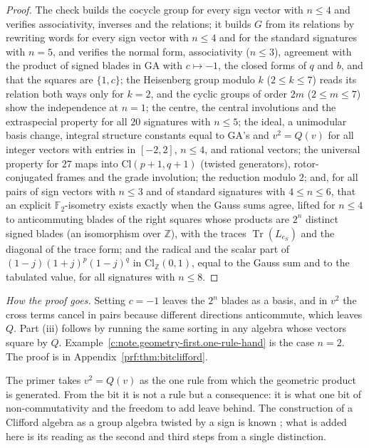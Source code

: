 \documentclass[11pt]{article}
\theoremstyle{definition}
\theoremstyle{plain}
\providecommand{\Cl}{}\renewcommand{\Cl}{\mathrm{Cl}}
\providecommand{\Tr}{}\renewcommand{\Tr}{\operatorname{Tr}}
\providecommand{\Z}{}\renewcommand{\Z}{\mathbb{Z}}
\begin{document}
\begin{proof}
The check builds the cocycle group for every sign vector with $n \le 4$ and verifies associativity, inverses and the relations; it builds $G$ from its relations by rewriting words for every sign vector with $n \le 4$ and for the standard signatures with $n = 5$, and verifies the normal form, associativity ($n \le 3$), agreement with the product of signed blades in GA with $c \mapsto -1$, the closed forms of $q$ and $b$, and that the squares are $\{1, c\}$; the Heisenberg group modulo $k$ ($2 \le k \le 7$) reads its relation both ways only for $k = 2$, and the cyclic groups of order $2m$ ($2 \le m \le 7$) show the independence at $n = 1$; the centre, the central involutions and the extraspecial property for all $20$ signatures with $n \le 5$; the ideal, a unimodular basis change, integral structure constants equal to GA's and $v^{2} = Q(v)$ for all integer vectors with entries in $[-2, 2]$, $n \le 4$, and rational vectors; the universal property for $27$ maps into $\Cl(p{+}1, q{+}1)$ (twisted generators), rotor-conjugated frames and the grade involution; the reduction modulo $2$; and, for all pairs of sign vectors with $n \le 3$ and of standard signatures with $4 \le n \le 6$, that an explicit $\mathbb{F}_{2}$-isometry exists exactly when the Gauss sums agree, lifted for $n \le 4$ to anticommuting blades of the right squares whose products are $2^{n}$ distinct signed blades (an isomorphism over $\Z$), with the traces $\Tr(L_{e_{S}})$ and the diagonal of the trace form; and the radical and the scalar part of $(1 - j)(1 + j)^{p}(1 - j)^{q}$ in $\Cl_{\Z}(0,1)$, equal to the Gauss sum and to the tabulated value, for all signatures with $n \le 8$.

\end{proof}

\label{c:note.geometry-first.setting-superposition-one-rule-theorem-3}
\noindent\emph{How the proof goes.} Setting $c = -1$ leaves the $2^{n}$ blades as a basis, and in $v^{2}$ the cross terms cancel in pairs because different directions anticommute, which leaves $Q$. Part (iii) follows by running the same sorting in any algebra whose vectors square by $Q$. Example~\ref{c:note.geometry-first.one-rule-hand} is the case $n = 2$. The proof is in Appendix~\ref{prf:thm:bitclifford}.

The primer \cite[Section 2]{ButlerT0} takes $v^{2} = Q(v)$ as the one rule from which the geometric product is generated. From the bit it is not a rule but a consequence: it is what one bit of non-commutativity and the freedom to add leave behind. The construction of a Clifford algebra as a group algebra twisted by a sign is known \cite{AlbuquerqueMajid2002}; what is added here is its reading as the second and third steps from a single distinction.
\end{document}

